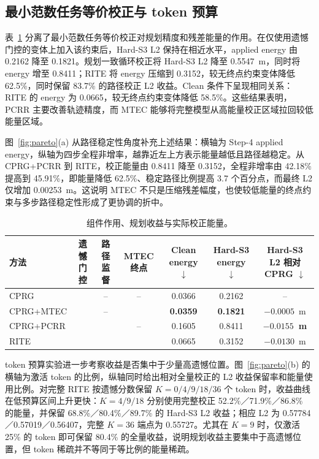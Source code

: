 \documentclass[letterpaper,10pt,conference]{ieeeconf}
\newcommand{\cmark}{\ding{51}}
\begin{document}
\subsection{最小范数任务等价校正与 token 预算}

表~\ref{tab:energy} 分离了最小范数任务等价校正对规划精度和残差能量的作用。在仅使用遗憾门控的变体上加入该约束后，Hard-S3 L2 保持在相近水平，applied energy 由 0.2162 降至 0.1821。规划一致循环校正将 Hard-S3 L2 降至 0.5547~m，同时将 energy 增至 0.8411；RITE 将 energy 压缩到 0.3152，较无终点约束变体降低 62.5\%，同时保留 83.7\% 的路径校正 L2 收益。Clean 条件下呈现相同关系：RITE 的 energy 为 0.0665，较无终点约束变体降低 58.5\%。这些结果表明，PCRR 主要改善轨迹精度，而 MTEC 能够将完整模型从高能量校正区域拉回较低能量区域。

图~\ref{fig:pareto}(a) 从路径稳定性角度补充上述结果：横轴为 Step-4 applied energy，纵轴为四步全程非增率，越靠近左上方表示能量越低且路径越稳定。从 CPRG+PCRR 到 RITE，校正能量由 0.8411 降至 0.3152，全程非增率由 42.18\% 提高到 45.91\%，即能量降低 62.5\%、稳定路径比例提高 3.7 个百分点，而最终 L2 仅增加 0.00253~m。这说明 MTEC 不只是压缩残差幅度，也使较低能量的终点约束与多步路径稳定性形成了更协调的折中。

\begin{table}[t]
\caption{组件作用、规划收益与实际校正能量。}
\label{tab:energy}
\centering
\small
\setlength{\tabcolsep}{7pt}
\begin{tabular}{lcccccc}
\toprule
方法 & 遗憾门控 & 路径监督 & MTEC 终点 & Clean energy $\downarrow$ & Hard-S3 energy $\downarrow$ & Hard-S3 L2 相对 CPRG $\downarrow$ \\
\midrule
CPRG & \cmark & -- & -- & 0.0366 & 0.2162 & -- \\
CPRG+MTEC & \cmark & -- & \cmark & \textbf{0.0359} & \textbf{0.1821} & $-0.0005$~m \\
CPRG+PCRR & \cmark & \cmark & -- & 0.1605 & 0.8411 & \textbf{$-0.0155$~m} \\
RITE & \cmark & \cmark & \cmark & 0.0665 & 0.3152 & $-0.0130$~m \\
\bottomrule
\end{tabular}
\end{table}

token 预算实验进一步考察收益是否集中于少量高遗憾位置。图~\ref{fig:pareto}(b) 的横轴为激活 token 的比例，纵轴同时给出相对全量校正的 L2 收益保留率和能量使用比例。对完整 RITE 按遗憾分数保留 $K=0/4/9/18/36$ 个 token 时，收益曲线在低预算区间上升更快：$K=4/9/18$ 分别使用完整校正 52.2\%／71.9\%／86.8\% 的能量，并保留 68.8\%／80.4\%／89.7\% 的 Hard-S3 L2 收益；相应 L2 为 0.57784／0.57019／0.56407，完整 $K=36$ 端点为 0.55727。尤其在 $K=9$ 时，仅激活 25\% 的 token 即可保留 80.4\% 的全量收益，说明规划收益主要集中于高遗憾位置，但 token 稀疏并不等同于等比例的能量稀疏。
\end{document}
